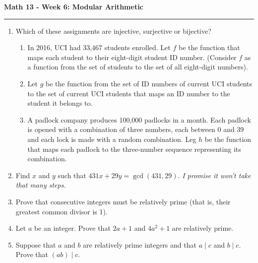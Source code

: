 \documentclass[12pt]{report}
\theoremstyle{definition}
\newcommand{\integers}{\mathbb{Z}}
\begin{document}
\begin{center}
{\bf \Large Math 13 - Week 6: Modular Arithmetic}
\vspace{0.2cm}
\hrule
\end{center}

\begin{enumerate}

\item Which of these assignments are injective, surjective or bijective?
\begin{enumerate}
	\item In 2016, UCI had 33,467 students enrolled. Let $f$ be the function that maps each student to their eight-digit student ID number. (Consider $f$ as a function from the set of students to the set of all eight-digit numbers).

	\vfill
	\item Let $g$ be the function from the set of ID numbers of current UCI students to the set of current UCI students that maps an ID number to the student it belongs to.

	\vfill

	\item A padlock company produces 100,000 padlocks in a month. Each padlock is opened with a combination of three numbers, each between 0 and 39 and each lock is made with a random combination. Leg $h$ be the function that maps each padlock to the three-number sequence representing its combination.

\end{enumerate}

\vfill

\item Find $x$ and $y$ such that $431x + 29y = \gcd(431, 29)$. \textit{I promise it won't take that many steps.}

\vfill

\item Prove that consecutive integers must be relatively prime (that is, their greatest common divisor is 1).

\vfill

\item Let $a$ be an integer. Prove that $2a+1$ and $4a^2+1$ are relatively prime.

\vfill

\item Suppose that $a$ and $b$ are relatively prime integers and that $a\mid c$ and $b\mid c$. Prove that $(ab)\mid c$.
\vfill



\end{enumerate}
\end{document}

